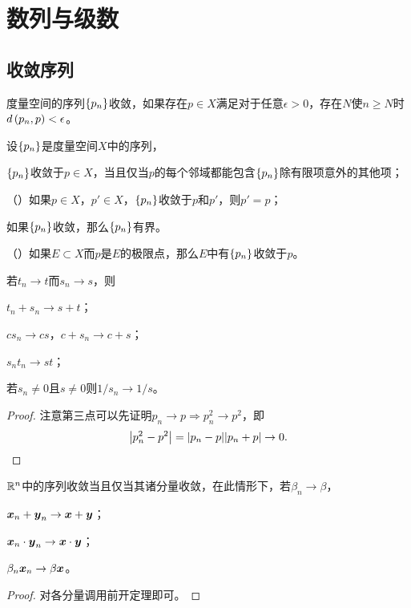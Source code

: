 \documentclass{ctexrep}
\begin{document}
  \section{数列与级数}
  \subsection{收敛序列}
  \begin{definition}
    度量空间的序列$\left\{p_n\right\}$收敛，如果存在$p\in X$满足对于任意$\epsilon > 0$，存在$N$使$n\ge N$时$d\left(p_n,p\right) < \epsilon$。
  \end{definition}
  \begin{theorem}
    设$\left\{p_n\right\}$是度量空间$X$中的序列，
    \begin{cenum}
      \item $\left\{p_ n\right\}$收敛于$p\in X$，当且仅当$p$的每个邻域都能包含$\left\{p_n\right\}$除有限项意外的其他项；
      \item （）如果$p\in X$，$p' \in X$，$\left\{p_n\right\}$收敛于$p$和$p'$，则$p'=p$；
      \item 如果$\left\{p_n\right\}$收敛，那么$\left\{p_n\right\}$有界。
      \item （）如果$E\subset X$而$p$是$E$的极限点，那么$E$中有$\left\{p_n\right\}$收敛于$p$。
    \end{cenum}
  \end{theorem}
  \begin{theorem}
    若$t_n\rightarrow t$而$s_n\rightarrow s$，则
    \begin{cenum}
      \item $t_n + s_n \rightarrow s+t$；
      \item $c s_n \rightarrow cs$，$c+s_n\rightarrow c+s$；
      \item $s_n t_n \rightarrow st$；
      \item 若$s_n\neq 0$且$s\neq 0$则$1/s_n\rightarrow 1/s$。
    \end{cenum}
  \end{theorem}
  \begin{proof}
    注意第三点可以先证明$p_n\rightarrow p \Rightarrow p_n^2\rightarrow p^2$，即
    \[ \abs{p_n^2-p^2}=\abs{p_n-p}\abs{p_n+p}\rightarrow 0. \qedhere\]
  \end{proof}
  \begin{theorem}
    $\mathbb{R}^n$中的序列收敛当且仅当其诸分量收敛，在此情形下，若$\beta_n\rightarrow \beta$，
    \begin{cenum}
      \item $\boldsymbol{x}_n + \boldsymbol{y}_n \rightarrow \boldsymbol{x}+\boldsymbol{y}$；
      \item $\boldsymbol{x}_n\cdot\boldsymbol{y}_n\rightarrow \boldsymbol{x}\cdot\boldsymbol{y}$；
      \item $\beta_n\boldsymbol{x}_n\rightarrow\beta\boldsymbol{x}$。
    \end{cenum}
  \end{theorem}
  \begin{proof}
    对各分量调用前开定理即可。
  \end{proof}
\end{document}

